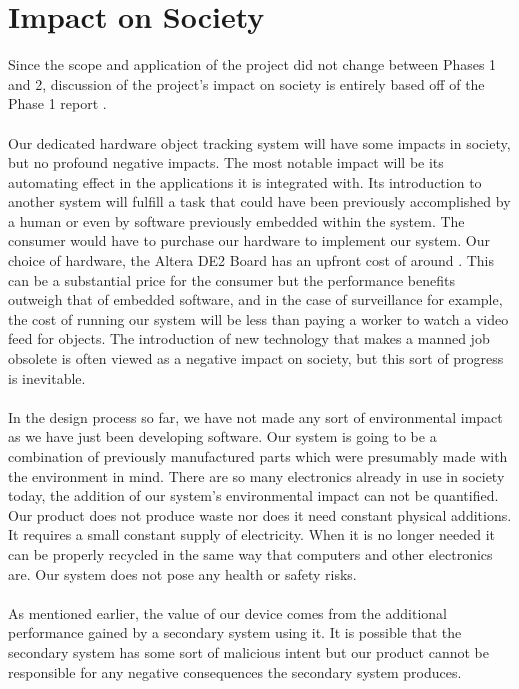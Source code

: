 \documentclass[11pt]{article} %
\begin{document}
\section{Impact on Society}
Since the scope and application of the project did not change between Phases 1 and 2, discussion of the project's impact on society is entirely based off of the Phase 1 report \cite{phase1}. \\\\
Our dedicated hardware object tracking system will have some impacts in society, but no profound negative impacts. The most notable impact will be its automating effect in the applications it is integrated with. Its introduction to another system will fulfill a task that could have been previously accomplished by a human or even by software previously embedded within the system. The consumer would have to purchase our hardware to implement our system. Our choice of hardware, the Altera DE2 Board has an upfront cost of around . This can be a substantial price for the consumer but the performance benefits outweigh that of embedded software, and in the case of surveillance for example, the cost of running our system will be less than paying a worker to watch a video feed for objects. The introduction of new technology that makes a manned job obsolete is often viewed as a negative impact on society, but this sort of progress is inevitable. \\\\
In the design process so far, we have not made any sort of environmental impact as we have just been developing software. Our system is going to be a combination of previously manufactured parts which were presumably made with the environment in mind. There are so many electronics already in use in society today, the addition of our system's environmental impact can not be quantified. Our product does not produce waste nor does it need constant physical additions. It requires a small constant supply of electricity. When it is no longer needed it can be properly recycled in the same way that computers and other electronics are. Our system does not pose any health or safety risks.\\\\
As mentioned earlier, the value of our device comes from the additional performance gained by a secondary system using it. It is possible that the secondary system has some sort of malicious intent but our product cannot be responsible for any negative consequences the secondary system produces. 
\end{document}
